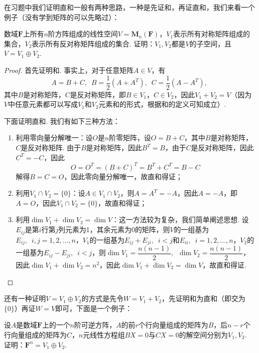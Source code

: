 在习题中我们证明直和一般有两种思路，一种是先证和，再证直和，我们来看一个例子（没有学到矩阵的可以先略过）：
\begin{example}{}{}
    数域$\mathbf{F}$上所有$n$阶方阵组成的线性空间$V=\mathbf{M}_n(\mathbf{F})$，$V_1$表示所有对称矩阵组成的集合，$V_2$表示所有反对称矩阵组成的集合. 证明：$V_1,V_2$都是$V$的子空间，且$V=V_1\oplus V_2$.
\end{example}

\begin{proof}
    首先证明和. 事实上，对于任意矩阵$A\in V$，有
    \[A=B+C,\enspace B=\frac{1}{2}(A+A^T),\enspace C=\frac{1}{2}(A-A^T),\]
    其中$B$是对称矩阵，$C$是反对称矩阵，即$B\in V_1$，$C\in V_2$，因此$V_1+V_2=V$（因为$V$中任意元素都可以写成$V_1$和$V_2$元素和的形式，根据和的定义可知成立）.

    下面证明直和. 我们有如下三种方法：
    \begin{enumerate}
        \item 利用零向量分解唯一：设$O$是$n$阶零矩阵，设$O=B+C$，其中$B$是对称矩阵，$C$是反对称矩阵. 由于$B$是对称矩阵，因此$B^T=B$，由于$C$是反对称矩阵，因此$C^T=-C$，因此
              \[O=O^T=(B+C)^T=B^T+C^T=B-C\]
              解得$B=C=O$，因此零向量分解唯一，故直和得证；

        \item 利用$V_1\cap V_2=\{0\}$：设$A\in V_1\cap V_2$，则$A=A^T=-A$，因此$A=-A$，即$A=O$，因此$V_1\cap V_2=\{0\}$，故直和得证；

        \item 利用$\dim V_1+\dim V_2=\dim V$：这一方法较为复杂，我们简单阐述思想. 设$E_{ij}$是第$i$行第$j$列元素为1，其余元素为0的矩阵，则$V$的一组基为$E_{ij},\enspace i,j=1,2,\ldots,n$，$V_1$的一组基为$E_{ij}+E_{ji},\enspace i<j$和$E_{ii},\enspace i=1,2,\ldots,n$，$V_2$的一组基为$E_{ij}-E_{ji},\enspace i<j$，则$\dim V_1=\dfrac{n(n-1)}{2},\enspace \dim V_2=\dfrac{n(n-1)}{2}$，因此$\dim V_1+\dim V_2=n^2$，因此$\dim V_1+\dim V_2=\dim V$，故直和得证.
    \end{enumerate}
\end{proof}

还有一种证明$V=V_1\oplus V_2$的方式是先令$W=V_1+V_2$，先证明和为直和（即交为$\{0\}$）再证$W=V$即可，下面是一个例子：
\begin{example}{}{}
    设$A$是数域$\mathbf{F}$上的一个$n$阶可逆方阵，$A$的前$r$个行向量组成的矩阵为$B$，后$n-r$个行向量组成的矩阵为$C$，$n$元线性方程组$BX=0$与$CX=0$的解空间分别为$V_1,V_2$. 证明：$\mathbf{F}^n=V_1\oplus V_2$.
\end{example}

